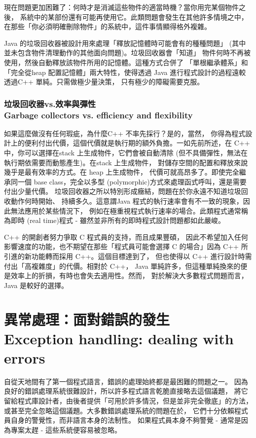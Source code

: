 現在問題更加困難了：何時才是消滅這些物件的適當時機？當你用完某個物件之後，
系統中的某部份還有可能再使用它。此類問題會發生在其他許多情境之中，
在那些「你必須明確刪除物件」的系統中，這件事情顯得格外複雜。

Java 的垃圾回收器被設計用來處理「釋放記憶體時可能會有的種種問題」
(其中並未包含物件清理動作的其他面向問題)。垃圾回收器會「知道」
物件何時不再被使用，然後自動釋放該物件所用的記憶體。這種方式合併了
「單根繼承體系」和「完全從heap 配置記憶體」兩大特性，使得透過
Java 進行程式設計的過程遠較透過C++ 單純。只需做極少量決策，
只有極少的障礙需要克服。

\subsubsection{垃圾回收器vs.效率與彈性 \\
Garbage collectors vs. efficiency and flexibility}
如果這麼做沒有任何瑕疵，為什麼C++ 不率先採行？是的，當然，
你得為程式設計上的便利付出代價，這個代價就是執行期的額外負擔。一如先前所述，在
C++ 中，你可以選擇在stack 上生成物件，它們會被自動清除
(但不具備彈性，無法在執行期依需要而動態產生)。在stack
上生成物件，
對儲存空間的配置和釋放來說幾乎是最有效率的方式。在 heap 上生成物件，
代價可就高昂多了。即使完全繼承同一個 base class，完全以多型
(polymorphic)方式來處理函式呼叫，還是需要付出少量代價。
垃圾回收器之所以特別形成癥結，問題在於你永遠不知道垃圾回收動作何時開始、
持續多久。這意謂Java 程式的執行速率會有不一致的現象，因此無法應用於某些情況下，
例如在極重視程式執行速率的場合。此類程式通常稱為即時
(real time)程式 -  雖然並非所有的即時程式設計問題都如此嚴峻。

C++ 的開創者努力爭取 C 程式員的支持，而且成果豐碩，
因此不希望加入任何影響速度的功能，也不期望在那些「程式員可能會選擇
C 的場合」因為 C++ 所引進的新功能轉而採用 C++。這個目標達到了，
但也使得以 C++ 進行設計時需付出「高複雜度」的代價。相對於 C++，
Java 單純許多，但這種單純換來的便是效率上的折損，有時也會失去適用性。然而，
對於解決大多數程式問題而言，Java 是較好的選擇。

\section[異常處理：面對錯誤的發生]{異常處理：面對錯誤的發生 \\
Exception handling: dealing with errors}
自從天地間有了第一個程式語言，錯誤的處理始終都是最困難的問題之一。
因為良好的錯誤處理系統很難設計，所以許多程式語言乾脆直接略去這個議題，
將它留給程式庫設計者，由後者提供「可用於許多情況，但是並非完全徹底」的方法，
或甚至完全忽略這個議題。大多數錯誤處理系統的問題在於，
它們十分依賴程式員自身的警覺性，而非語言本身的法制性。
如果程式員本身不夠警覺 - 通常是因為專案太趕 - 這些系統便容易被忽略。

